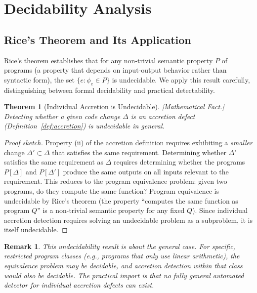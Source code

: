 \documentclass[11pt, a4paper, copyright]{googledeepmind}
\newtheorem{theorem}{Theorem}[section]
\newtheorem*{remark}{Remark}
\begin{document}
\section{Decidability Analysis}
\label{sec:decidability}

\subsection{Rice's Theorem and Its Application}

Rice's theorem \citep{rice1953} establishes that for any non-trivial semantic property $P$ of programs (a property that depends on input-output behavior rather than syntactic form), the set $\{e : \phi_e \in P\}$ is undecidable. We apply this result carefully, distinguishing between formal decidability and practical detectability.

\begin{theorem}[Individual Accretion is Undecidable]
\label{thm:undecidable}
\emph{[Mathematical Fact.]} Detecting whether a given code change $\Delta$ is an accretion defect (Definition~\ref{def:accretion}) is undecidable in general.
\end{theorem}

\begin{proof}[Proof sketch]
Property (ii) of the accretion definition requires exhibiting a \emph{smaller} change $\Delta' \subset \Delta$ that satisfies the same requirement. Determining whether $\Delta'$ satisfies the same requirement as $\Delta$ requires determining whether the programs $P[\Delta]$ and $P[\Delta']$ produce the same outputs on all inputs relevant to the requirement. This reduces to the program equivalence problem: given two programs, do they compute the same function? Program equivalence is undecidable by Rice's theorem (the property ``computes the same function as program $Q$'' is a non-trivial semantic property for any fixed $Q$). Since individual accretion detection requires solving an undecidable problem as a subproblem, it is itself undecidable.
\end{proof}

\begin{remark}
This undecidability result is about the \emph{general} case. For specific, restricted program classes (e.g., programs that only use linear arithmetic), the equivalence problem may be decidable, and accretion detection within that class would also be decidable. The practical import is that no fully general automated detector for individual accretion defects can exist.
\end{remark}
\end{document}
